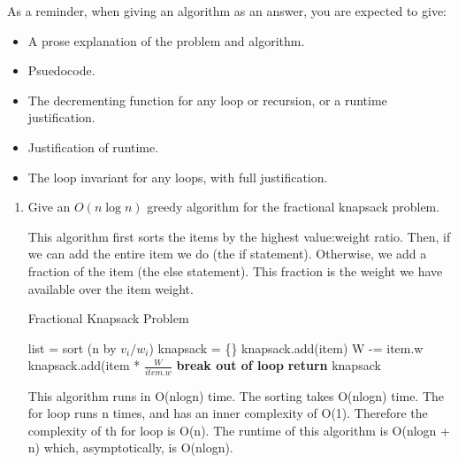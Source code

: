 \documentclass{article}
\begin{document}
As a reminder, when giving an algorithm as an answer, you
are expected to give:
\begin{itemize}
    \item A prose explanation of the problem and algorithm.
    \item Psuedocode.
    \item The decrementing function for any loop or recursion, or a runtime
        justification.
    \item Justification of runtime.
    \item The loop invariant for any loops, with full justification.
\end{itemize}

\begin{enumerate}
    \item Give an $O(n\log n)$ greedy algorithm for the fractional knapsack problem.
      
This algorithm first sorts the items by the highest value:weight ratio. Then, if we can add the entire item we do (the if statement). Otherwise, we add a fraction of the item (the else statement). This fraction is the weight we have available over the item weight. 

\begin{algorithm}
    \caption{Fractional Knapsack Problem}\label{fracKnap}
    \begin{algorithmic}[1]
      \State list = sort (n by $v_i/w_i$)
      \State knapsack = \{\}
      		\State knapsack.add(item)
      		\State W -= item.w
      	\Else
      		\State knapsack.add(item * $\frac{W}{item.w}$
      		\State \textbf{break out of loop}
      	\EndIf
      \EndFor
      \State \textbf{return} knapsack
    \EndFunction
    \end{algorithmic}
\end{algorithm} 

This algorithm runs in O(nlogn) time. The sorting takes O(nlogn) time. The for loop runs n times, and has an inner complexity of O(1). Therefore the complexity of th for loop is O(n). The runtime of this algorithm is O(nlogn + n) which, asymptotically, is O(nlogn).


\end{enumerate}
\end{document}
